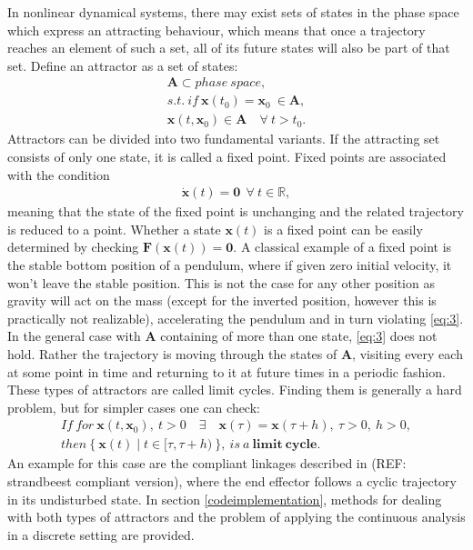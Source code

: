     In nonlinear dynamical systems, there may exist sets of states in the phase space which express an attracting behaviour, which means that once a trajectory reaches an element of such a set, all of its future states will also be part of that set. Define an attractor as a set of states:
    \begin{gather} \mathbf{A} \subset phase\ space,\\ s.t.\ if \ \mathbf{x}(t_0) = \mathbf{x}_0\ \in \mathbf{A}, \\ \mathbf{x}(t,\mathbf{x}_0) \in \mathbf{A}\quad \forall\ t > t_0. \label{eq:2} \end{gather}
    Attractors can be divided into two fundamental variants.
    If the attracting set consists of only one state, it is called a fixed point. Fixed points are associated with the condition
    \begin{gather}  \dot{\mathbf{x}}(t) = \mathbf{0}\ \ \forall \ t \in \mathbb{R}, \label{eq:3} \end{gather}
    meaning that the state of the fixed point is unchanging and the related trajectory is reduced to a point. Whether a state $\mathbf{x}(t)$ is a fixed point can be easily determined by checking $\mathbf{F}(\mathbf{x}(t)) = \mathbf{0} \label{eq:4}$. A classical example of a fixed point is the stable bottom position of a pendulum, where if given zero initial velocity, it won't leave the stable position. This is not the case for any other position as gravity will act on the mass (except for the inverted position, however this is practically not realizable), accelerating the pendulum and in turn violating \ref{eq:3}.
    In the general case with $\mathbf{A}$ containing of more than one state, \ref{eq:3} does not hold. Rather the trajectory is moving through the states of $\mathbf{A}$, visiting every each at some point in time and returning to it at future times in a periodic fashion. These types of attractors are called limit cycles. Finding them is generally a hard problem, but for simpler cases one can check:
    \begin{gather} If\ for \ \mathbf{x}(t,\mathbf{x}_0) ,\ t > 0 \quad \exists \quad \mathbf{x}(\tau) = \mathbf{x}(\tau + h),\ \tau > 0,\ h > 0, \\then\ \{\ \mathbf{x}(t) \mid t \in [\tau,\tau + h)\ \}, \ is \ a\ \mathbf{limit\ cycle}.\label{eq:5} \end{gather}
    An example for this case are the compliant linkages described in (REF: strandbeest compliant version), where the end effector follows a cyclic trajectory in its undisturbed state. 
    In section \ref{codeimplementation}, methods for dealing with both types of attractors and the problem of applying the continuous analysis in a discrete setting are provided. 

